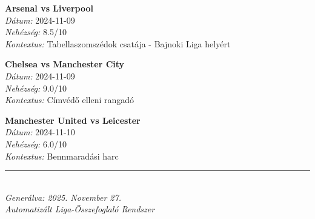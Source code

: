 \documentclass[11pt,a4paper]{article}
\begin{document}
    \begin{tcolorbox}[colback=blue!5,colframe=blue!30]
    \textbf{Arsenal vs Liverpool} \\
    \textit{Dátum:} 2024-11-09 \\
    \textit{Nehézség:} 8.5/10 \\
    \textit{Kontextus:} Tabellaszomszédok csatája - Bajnoki Liga helyért
    \end{tcolorbox}
    \vspace{0.5em}
    \begin{tcolorbox}[colback=blue!5,colframe=blue!30]
    \textbf{Chelsea vs Manchester City} \\
    \textit{Dátum:} 2024-11-09 \\
    \textit{Nehézség:} 9.0/10 \\
    \textit{Kontextus:} Címvédő elleni rangadó
    \end{tcolorbox}
    \vspace{0.5em}
    \begin{tcolorbox}[colback=blue!5,colframe=blue!30]
    \textbf{Manchester United vs Leicester} \\
    \textit{Dátum:} 2024-11-10 \\
    \textit{Nehézség:} 6.0/10 \\
    \textit{Kontextus:} Bennmaradási harc
    \end{tcolorbox}
    \vspace{0.5em}
\vfill

\begin{center}
\rule{0.5\textwidth}{0.4pt} \\
\textit{Generálva: 2025. November 27.} \\
\textit{Automatizált Liga-Összefoglaló Rendszer}
\end{center}
\end{document}
